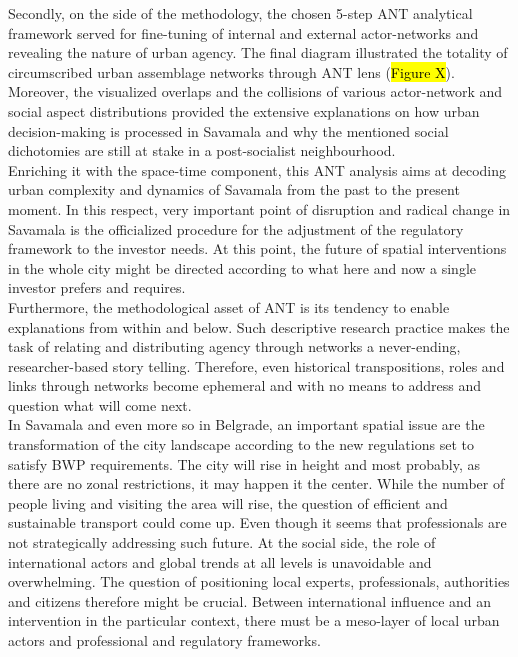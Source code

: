 \documentclass[11pt]{report}
\begin{document}
Secondly, on the side of the methodology, the chosen 5-step ANT analytical framework served for fine-tuning of internal and external actor-networks and revealing the nature of urban agency.
The final diagram illustrated the totality of circumscribed urban assemblage networks through ANT lens (\hl{Figure X}).
Moreover, the visualized overlaps and the collisions of various actor-network and social aspect distributions provided the extensive explanations on how urban decision-making is processed in Savamala and why the mentioned social dichotomies are still at stake in a post-socialist neighbourhood.
\\

Enriching it with the space-time component, this ANT analysis aims at decoding urban complexity and dynamics of Savamala from the past to the present moment.
In this respect, very important point of disruption and radical change in Savamala is the officialized procedure for the adjustment of the regulatory framework to the investor needs.
At this point, the future of spatial interventions in the whole city might be directed according to what here and now a single investor prefers and requires. 
\\

Furthermore, the methodological asset of ANT is its tendency to enable explanations from within and below.
Such descriptive research practice makes the task of relating and distributing agency through networks a never-ending, researcher-based story telling.
Therefore, even historical transpositions, roles and links through networks become ephemeral and with no means to address and question what will come next.
\\
 
In Savamala and even more so in Belgrade, an important spatial issue are the transformation of the city landscape according to the new regulations set to satisfy BWP requirements.
The city will rise in height and most probably, as there are no zonal restrictions, it may happen it the center. While the number of people living and visiting the area will rise, the question of efficient and sustainable transport could come up. 
Even though it seems that professionals are not strategically addressing such future.
At the social side, the role of international actors and global trends at all levels is unavoidable and overwhelming. 
The question of positioning local experts, professionals, authorities and citizens therefore might be crucial.
Between international influence and an intervention in the particular context, there must be a meso-layer of local urban actors and professional and regulatory frameworks.
\\
\end{document}
